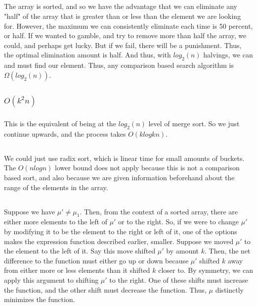 \documentclass{article}
\begin{document}
\subsection{}The array is sorted, and so we have the advantage that we can eliminate any "half" of the array that is greater than or less than the element we are looking for. However, the maximum we can consistently eliminate each time is 50 percent, or half. If we wanted to gamble, and try to remove more than half the array, we could, and perhaps get lucky. But if we fail, there will be a punishment. Thus, the optimal elimination amount is half. And thus, with $log_2(n)$ halvings, we can and must find our element. Thus, any comparison based search algorithm is $\Omega(log_2(n))$.
\subsection{}
\subsubsection{$O(k^2n)$}
\subsubsection{}This is the equivalent of being at the $log_2(n)$ level of merge sort. So we just continue upwards, and the process takes $O(klogkn)$.
\subsection{}We could just use radix sort, which is linear time for small amounts of buckets. The $O(nlogn)$ lower bound does not apply because this is not a comparison based sort, and also because we are given information beforehand about the range of the elements in the array. 
\subsection{}
\subsubsection{}Suppose we have $\mu' \neq \mu_1$. Then, from the context of a sorted array, there are either more elements to the left of $\mu'$ or to the right. So, if we were to change $\mu'$ by modifying it to be the element to the right or left of it, one of the options makes the expression function described earlier, smaller. Suppose we moved $\mu'$ to the element to the left of it. Say this move shifted $\mu'$ by amount $k$. Then, the net difference to the function must either go up or down because $\mu'$ shifted $k$ away from either more or less elements than it shifted $k$ closer to. By symmetry, we can apply this argument to shifting $\mu'$ to the right. One of these shifts must increase the function, and the other shift must decrease the function. Thus, $\mu$ distinctly minimizes the function.
\end{document}
